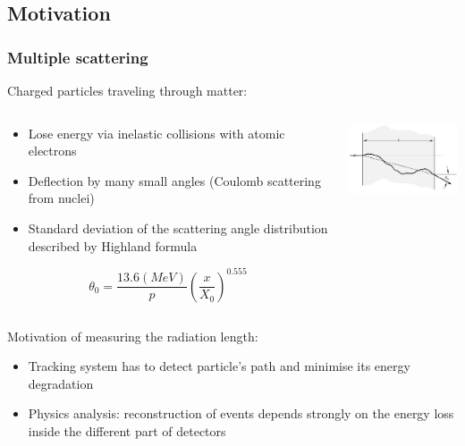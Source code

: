 \documentclass{beamer}
\begin{document}
  \subsection{Motivation}

  \begin{frame}
    \frametitle{Multiple scattering}
    
    \vspace{-0.4cm} 
    \begin{block}{Charged particles traveling through matter:}
      \vspace{-0.3cm}
      \begin{columns}[c]
        \begin{column}{5cm}
          \footnotesize
          \begin{itemize}
            \item Lose energy via inelastic collisions with atomic electrons
            \item Deflection by many small angles (Coulomb scattering from nuclei)
            \item Standard deviation of the scattering angle distribution described by Highland formula
          \end{itemize}
          \centering
            \[ \theta_0 = \frac{13.6 (MeV)}{p}\left( \frac{x}{X_0}\right)^{0.555}\]
        \end{column}
        \begin{column}{6cm}
          \centering
          \includegraphics[width = 5cm]{Pictures/multiple_scattering.jpg}
        \end{column}
      \end{columns}
    \end{block}

    \vspace{-0.2cm}
    \begin{block}{Motivation of measuring the radiation length:}
      \footnotesize
      \begin{itemize}
        \item Tracking system has to detect particle's path and minimise its energy degradation
        \item Physics analysis: reconstruction of events depends strongly on the energy loss inside the different part of detectors
      \end{itemize}
    \end{block}
  \end{frame} 
  
\end{document}
